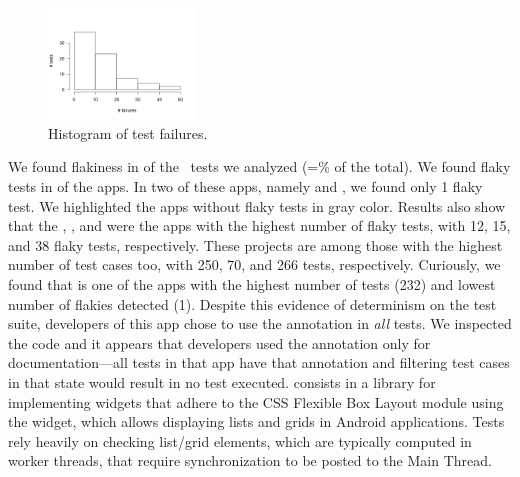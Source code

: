 \documentclass[conference]{IEEEtran}
\begin{document}
\begin{figure}[t!]
    \centering
    \includegraphics[trim=0 0 10 50,clip,width=0.35\textwidth,height=0.22\textwidth]{figs/histogram.png}
    \vspace{-2ex}
    \caption{Histogram of test failures.}
    \label{fig:histogram-testfailures}
    \vspace{-3ex}
\end{figure}

We found flakiness in \numflakytestsds{} of the \totalTests\ tests we analyzed (=\percFlakyTestSds{}\% of the total). We found flaky tests in \numprojectsWithFlakies{} of the \numprojects{} apps. In two of these apps, namely  and , we found only 1 flaky test. We highlighted the apps without flaky tests in gray color. Results also show that the , , and  were the apps with the highest number of flaky tests, with 12, 15, and 38 flaky tests, respectively. These projects are among those with the highest number of test cases too, with 250, 70, and 266 tests, respectively. Curiously, we found that  is one of the apps with the highest number of tests (232) and lowest number of flakies detected (1). Despite this evidence of determinism on the test suite, developers of this app chose to use the annotation  in \emph{all} tests. We inspected the code and it appears that developers used the annotation only for documentation---all tests in that app have that annotation and filtering test cases in that state would result in no test executed.
 consists in a library for implementing widgets that adhere to the CSS Flexible Box Layout module using the  widget, which allows displaying lists and grids in Android applications. Tests rely heavily on checking list/grid elements, which are typically computed in worker threads, that require synchronization to be posted to the Main Thread. 
\end{document}
